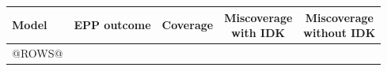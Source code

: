 \begin{tabular}{@{}llccc@{}}
\toprule
Model & EPP outcome & Coverage & \shortstack{Miscoverage\\with IDK} & \shortstack{Miscoverage\\without IDK}\\
\midrule
@ROWS@
\bottomrule
\end{tabular}
